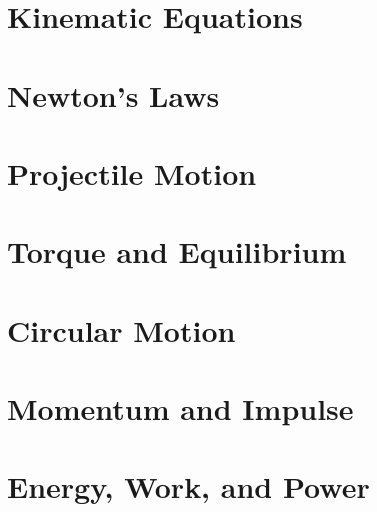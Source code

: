 \documentclass{report}
\begin{document}
\newpage
\chapter{Kinematic Equations}

\newpage
\chapter{Newton's Laws}

\newpage
\chapter{Projectile Motion}

\newpage
\chapter{Torque and Equilibrium}

\newpage
\chapter{Circular Motion}

\newpage
\chapter{Momentum and Impulse}

\newpage
\chapter{Energy, Work, and Power}
\end{document}
